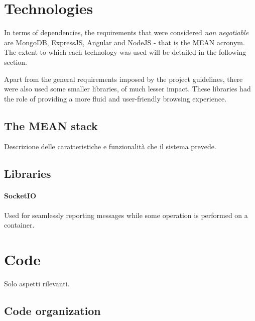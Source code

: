 \documentclass[multi, tikz]{article}
\begin{document}

\section{Technologies}
In terms of dependencies, the requirements that were considered {\em{non
    negotiable}} are MongoDB, ExpressJS, Angular and NodeJS - that is the MEAN
acronym. The extent to which each technology was used will be detailed in the
following section.

Apart from the general requirements imposed by the project guidelines, there
were also used some smaller libraries, of much lesser impact. These libraries
had the role of providing a more fluid and user-friendly browsing experience.


\subsection{The MEAN stack}
Descrizione delle caratteristiche e funzionalità che il sistema prevede.

\subsection{Libraries}
\paragraph{SocketIO}
Used for seamlessly reporting messages while some operation is performed on a
container.

\section{Code}
Solo aspetti rilevanti.
\subsection{Code organization}
\end{document}
